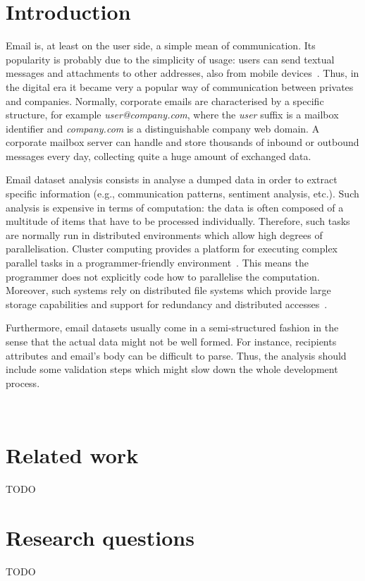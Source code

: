 \documentclass{vldb}
\begin{document}
\section{Introduction}
Email is, at least on the user side, a simple mean of communication.
Its popularity is probably due to the simplicity of usage: users can send textual messages and attachments to other addresses, also from mobile devices~\cite{chen2002enterprise}.   
Thus, in the digital era it became very a popular way of communication between privates and companies.
Normally, corporate emails are characterised by a specific structure, for example \textit{user@company.com}, where the \textit{user} suffix is a mailbox identifier and \textit{company.com} is a distinguishable company web domain.
A corporate mailbox server can handle and store thousands of inbound or outbound messages every day, collecting quite a huge amount of exchanged data.

Email dataset analysis consists in analyse a dumped data in order to extract specific information (e.g., communication patterns, sentiment analysis, etc.).
Such analysis is expensive in terms of computation: the data is often composed of a multitude of items that have to be processed individually.
Therefore, such tasks are normally run in distributed environments which allow high degrees of parallelisation.
Cluster computing provides a platform for executing complex parallel tasks in a programmer-friendly environment~\cite{buyya1999high, zaharia2010spark, shvachko2010hadoop}.
This means the programmer does not explicitly code how to parallelise the computation.
Moreover, such systems rely on distributed file systems which provide large storage capabilities and support for redundancy and distributed accesses~\cite{weil2006ceph}.

Furthermore, email datasets usually come in a semi-structured fashion in the sense that the actual data might not be well formed. 
For instance, recipients attributes and email's body can be difficult to parse.
Thus, the analysis should include some validation steps which might slow down the whole development process.

 
~\cite{shetty2004enron}


\section{Related work}
TODO

\section{Research questions}
TODO
\end{document}
